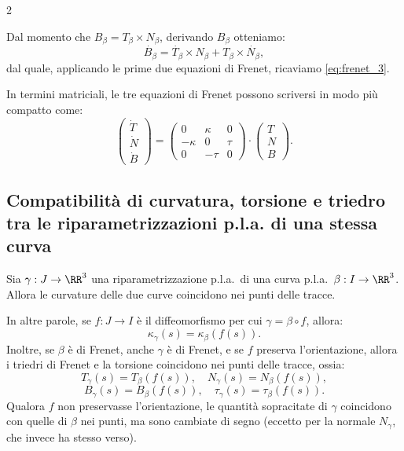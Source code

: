 \begin{multicols*}{2}
    \begin{remark}
        Dal momento che $B_\beta = T_\beta \times N_\beta$, derivando
        $B_\beta$ otteniamo:
        \[ \dot{B_\beta} = \dot{T_\beta} \times N_\beta + T_\beta \times \dot{N_\beta}, \]
        dal quale, applicando le prime due equazioni di Frenet, ricaviamo \eqref{eq:frenet_3}.
    \end{remark}

    \begin{remark}
        In termini matriciali, le tre equazioni di Frenet possono scriversi
        in modo più compatto come:
        \[
            \begin{pmatrix}
                \dot{T} \\
                \dot{N} \\
                \dot{B}
            \end{pmatrix} =
            \begin{pmatrix}
                0       & \kappa & 0    \\
                -\kappa & 0      & \tau \\
                0       & -\tau  & 0
            \end{pmatrix} \cdot
            \begin{pmatrix}
                T \\
                N \\
                B
            \end{pmatrix}.
        \]
    \end{remark}

    \subsection{Compatibilità di curvatura, torsione e triedro tra le riparametrizzazioni p.l.a. di una stessa curva}

    \begin{proposition} \label{prop:compatibilità_riparametrizzazioni_pla}
        Sia $\gamma : J \to \RR^3$ una riparametrizzazione p.l.a.~di una curva p.l.a.~$\beta : I \to \RR^3$.
        Allora le curvature delle due curve coincidono nei
        punti delle tracce. \medskip

        In altre parole, se $f : J \to I$ è il diffeomorfismo per cui
        $\gamma = \beta \circ f$, allora:
        \[
            \kappa_\gamma(s) = \kappa_\beta(f(s)).
        \]
        Inoltre, se $\beta$ è di Frenet, anche $\gamma$ è di Frenet, e se $f$ preserva l'orientazione,
        allora i triedri di Frenet e la torsione coincidono nei punti delle tracce, ossia:
        \[
            T_\gamma(s) = T_\beta(f(s)), \quad N_\gamma(s) = N_\beta(f(s)),
        \]
        \[
            B_\gamma(s) = B_\beta(f(s)), \quad \tau_\gamma(s) = \tau_\beta(f(s)).
        \]
        Qualora $f$ non preservasse l'orientazione, le quantità sopracitate di $\gamma$
        coincidono con quelle di $\beta$ nei punti, ma sono cambiate di segno (eccetto per la normale
        $N_\gamma$, che invece ha stesso verso).
    \end{proposition}


\end{multicols*}
